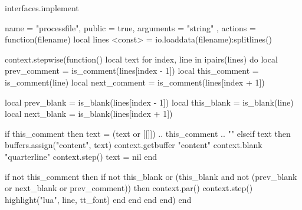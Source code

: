     interfaces.implement {
        name = "processfile",
        public = true,
        arguments = { "string" },
        actions = function(filename)
            local lines <const> = io.loaddata(filename):splitlines()

            context.stepwise(function()
                local text
                for index, line in ipairs(lines) do
                    local prev_comment = is_comment(lines[index - 1])
                    local this_comment = is_comment(line)
                    local next_comment = is_comment(lines[index + 1])

                    local prev_blank = is_blank(lines[index - 1])
                    local this_blank = is_blank(line)
                    local next_blank = is_blank(lines[index + 1])

                    if this_comment then
                        text = (text or [[\noindent ]]) .. this_comment .. "\n"
                    elseif text then
                        buffers.assign("content", text)
                        context.getbuffer { "content" }
                        context.blank { "quarterline" }
                        context.step()
                        text = nil
                    end

                    if not this_comment then
                        if not this_blank or
                           (this_blank and not (prev_blank or next_blank or prev_comment))
                        then
                            context.par()
                            context.step()
                            highlight("lua", line, tt_font)
                        end
                    end
                end
            end)
        end
    }
\stopluacode

\setuphead[subsection][
    alternative=normal,
    style=\ssbfa,
    after={\blank[disable, penalty:10000]},
    page=yes,
    continue=yes,
]

\startdocument[
    title=luatools,
    author=Max Chernoff,
    version=0.0.0, %
    github=https://github.com/gucci-on-fleek/luatools,
]
\stopdocument
